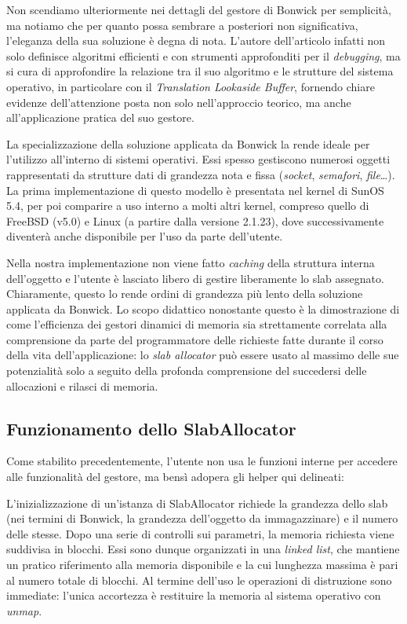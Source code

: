 Non scendiamo ulteriormente nei dettagli del gestore di Bonwick per semplicità, ma notiamo che per quanto possa sembrare a posteriori non significativa, l’eleganza della sua soluzione è degna di nota. L’autore dell’articolo infatti non solo definisce algoritmi efficienti e con strumenti approfonditi per il \textit{debugging}, ma si cura di approfondire la relazione tra il suo algoritmo e le strutture del sistema operativo, in particolare con il \textit{Translation Lookaside Buffer}, fornendo chiare evidenze dell’attenzione posta non solo nell’approccio teorico, ma anche all’applicazione pratica del suo gestore.

La specializzazione della soluzione applicata da Bonwick la rende ideale per l’utilizzo all’interno di sistemi operativi. Essi spesso gestiscono numerosi oggetti rappresentati da strutture dati di grandezza nota e fissa (\textit{socket}, \textit{semafori}, \textit{file}…). La prima implementazione di questo modello è presentata nel kernel di SunOS 5.4, per poi comparire a uso interno a molti altri kernel, compreso quello di FreeBSD (v5.0) e Linux (a partire dalla versione 2.1.23), dove successivamente diventerà anche disponibile per l’uso da parte dell’utente.

Nella nostra implementazione non viene fatto \textit{caching} della struttura interna dell’oggetto e l’utente è lasciato libero di gestire liberamente lo slab assegnato. Chiaramente, questo lo rende ordini di grandezza più lento della soluzione applicata da Bonwick. Lo scopo didattico nonostante questo è la dimostrazione di come l’efficienza dei gestori dinamici di memoria sia strettamente correlata alla comprensione da parte del programmatore delle richieste fatte durante il corso della vita dell’applicazione: lo \textit{slab allocator} può essere usato al massimo delle sue potenzialità solo a seguito della profonda comprensione del succedersi delle allocazioni e rilasci di memoria.

\subsection*{Funzionamento dello SlabAllocator}
Come stabilito precedentemente, l’utente non usa le funzioni interne per accedere alle funzionalità del gestore, ma bensì adopera gli helper qui delineati:


L’inizializzazione di un’istanza di SlabAllocator richiede la grandezza dello slab (nei termini di Bonwick, la grandezza dell’oggetto da immagazzinare) e il numero delle stesse. Dopo una serie di controlli sui parametri, la memoria richiesta viene suddivisa in blocchi. Essi sono dunque organizzati in una \textit{linked list}, che mantiene un pratico riferimento alla memoria disponibile e la cui lunghezza massima è pari al numero totale di blocchi. Al termine dell’uso le operazioni di distruzione sono immediate: l’unica accortezza è restituire la memoria al sistema operativo con \textit{unmap}.


